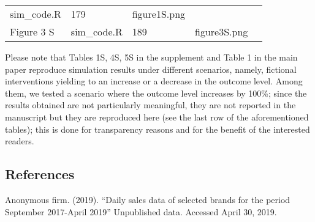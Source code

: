 \documentclass[
]{article}
\begin{document}
\begin{longtable}[]{@{}lllll@{}}
\begin{minipage}[t]{0.18\columnwidth}
sim\_code.R\strut
\end{minipage} & \begin{minipage}[t]{0.09\columnwidth}\raggedright
179\strut
\end{minipage} & \begin{minipage}[t]{0.23\columnwidth}\raggedright
figure1S.png\strut
\end{minipage} & \begin{minipage}[t]{0.23\columnwidth}\raggedright
 \strut
\end{minipage}\tabularnewline
\begin{minipage}[t]{0.13\columnwidth}\raggedright
Figure 3 S\strut
\end{minipage} & \begin{minipage}[t]{0.18\columnwidth}\raggedright
sim\_code.R\strut
\end{minipage} & \begin{minipage}[t]{0.09\columnwidth}\raggedright
189\strut
\end{minipage} & \begin{minipage}[t]{0.23\columnwidth}\raggedright
figure3S.png\strut
\end{minipage} & \begin{minipage}[t]{0.23\columnwidth}\raggedright
\strut
\end{minipage}\tabularnewline
\bottomrule
\end{longtable}

Please note that Tables 1S, 4S, 5S in the supplement and Table 1 in the main paper reproduce simulation results under different scenarios, namely, fictional interventions yielding to an increase or a decrease in the outcome level. Among them, we tested a scenario where the outcome level increases by 100\%; since the results obtained are not particularly meaningful, they are not reported in the manuscript but they are reproduced here (see the last row of the aforementioned tables); this is done for transparency reasons and for the benefit of the interested readers. 


\hypertarget{references}{%
\subsection{References}\label{references}}


Anonymous firm. (2019). ``Daily sales data of selected brands for the period September 2017-April 2019'' Unpublished data. Accessed April 30, 2019.
\end{document}
